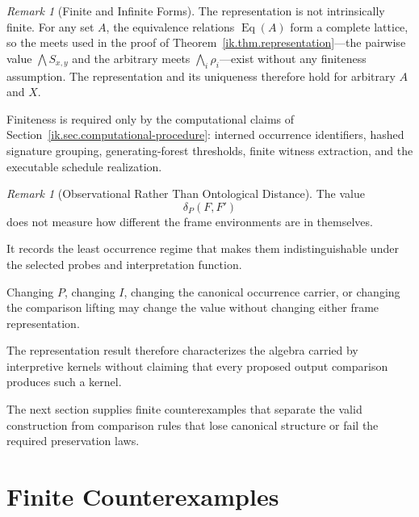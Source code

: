 \documentclass[11pt]{article}
\theoremstyle{plain}
\theoremstyle{definition}
\theoremstyle{remark}
\newtheorem{remark}[theorem]{Remark}
\begin{document}
\begin{remark}[Finite and Infinite Forms]
  \label{ik.rem.finite-representation}
  The representation is not intrinsically finite.
  For any set \(A\), the equivalence relations
  \(\operatorname{Eq}(A)\) form a complete lattice,
  so the meets used in the proof of
  Theorem~\ref{ik.thm.representation}---the pairwise
  value \(\bigwedge S_{x,y}\) and the arbitrary meets
  \(\bigwedge_{i}\rho_i\)---exist without any finiteness
  assumption.
  The representation and its uniqueness
  therefore hold for arbitrary \(A\) and \(X\).

  Finiteness is required only by the computational claims
  of Section~\ref{ik.sec.computational-procedure}:
  interned occurrence identifiers, hashed signature grouping,
  generating-forest thresholds, finite witness extraction,
  and the executable schedule realization.
\end{remark}

\begin{remark}[Observational Rather Than Ontological Distance]
  \label{ik.rem.observational-distance}
  The value
  \[
    \delta_P(F,F')
  \]
  does not measure how different
  the frame environments are in themselves.

  It records the least occurrence regime
  that makes them indistinguishable
  under the selected probes
  and interpretation function.

  Changing \(P\),
  changing \(I\),
  changing the canonical occurrence carrier,
  or changing the comparison lifting
  may change the value
  without changing either frame representation.
\end{remark}

The representation result therefore characterizes
the algebra carried by interpretive kernels
without claiming that every proposed output comparison
produces such a kernel.

The next section supplies finite counterexamples
that separate the valid construction
from comparison rules that lose canonical structure
or fail the required preservation laws.



\section{Finite Counterexamples}
\label{ik.sec.finite-counterexamples}
\end{document}
